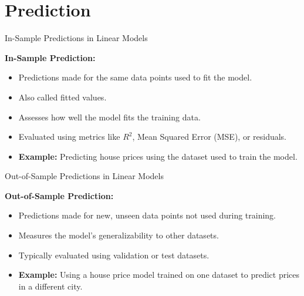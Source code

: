 \documentclass[aspectratio=169]{beamer}
\begin{document}

\section{\Large Prediction}

\begin{frame}{In-Sample Predictions in Linear Models}

\textbf{In-Sample Prediction:}  
\begin{itemize}
    \item Predictions made for the same data points used to fit the model.
    \item Also called fitted values.
    \item Assesses how well the model fits the training data.
    \item Evaluated using metrics like \( R^2 \), Mean Squared Error (MSE), or residuals.
    \item \textbf{Example:} Predicting house prices using the dataset used to train the model.
\end{itemize}

\end{frame}

\begin{frame}{Out-of-Sample Predictions in Linear Models}

\textbf{Out-of-Sample Prediction:}  
\begin{itemize}
    \item Predictions made for new, unseen data points not used during training.
    \item Measures the model's generalizability to other datasets.
    \item Typically evaluated using validation or test datasets.
    \item \textbf{Example:} Using a house price model trained on one dataset to predict prices in a different city.
\end{itemize}

\end{frame}
\end{document}
